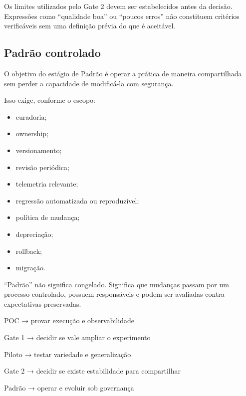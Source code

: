 \documentclass[
  10pt,
  a4paper,
  oneside]{book}
\newenvironment{Shaded}{}{}
\newcommand{\NormalTok}[1]{#1}
\providecommand{\tightlist}{%
  \setlength{\itemsep}{0pt}\setlength{\parskip}{0pt}}
\renewenvironment{Shaded}{\begin{snugshade}}{\end{snugshade}}%
\begin{document}
Os limites utilizados pelo Gate 2 devem ser estabelecidos antes da
decisão. Expressões como ``qualidade boa'' ou ``poucos erros'' não
constituem critérios verificáveis sem uma definição prévia do que é
aceitável.

\hypertarget{padruxe3o-controlado}{%
\subsection{Padrão controlado}\label{padruxe3o-controlado}}

O objetivo do estágio de Padrão é operar a prática de maneira
compartilhada sem perder a capacidade de modificá-la com segurança.

Isso exige, conforme o escopo:

\begin{itemize}
\tightlist
\item
  curadoria;
\item
  ownership;
\item
  versionamento;
\item
  revisão periódica;
\item
  telemetria relevante;
\item
  regressão automatizada ou reproduzível;
\item
  política de mudança;
\item
  depreciação;
\item
  rollback;
\item
  migração.
\end{itemize}

``Padrão'' não significa congelado. Significa que mudanças passam por um
processo controlado, possuem responsáveis e podem ser avaliadas contra
expectativas preservadas.

\begin{Shaded}
\begin{Highlighting}[]
\NormalTok{POC}
\NormalTok{→ provar execução e observabilidade}

\NormalTok{Gate 1}
\NormalTok{→ decidir se vale ampliar o experimento}

\NormalTok{Piloto}
\NormalTok{→ testar variedade e generalização}

\NormalTok{Gate 2}
\NormalTok{→ decidir se existe estabilidade para compartilhar}

\NormalTok{Padrão}
\NormalTok{→ operar e evoluir sob governança}
\end{Highlighting}
\end{Shaded}
\end{document}
